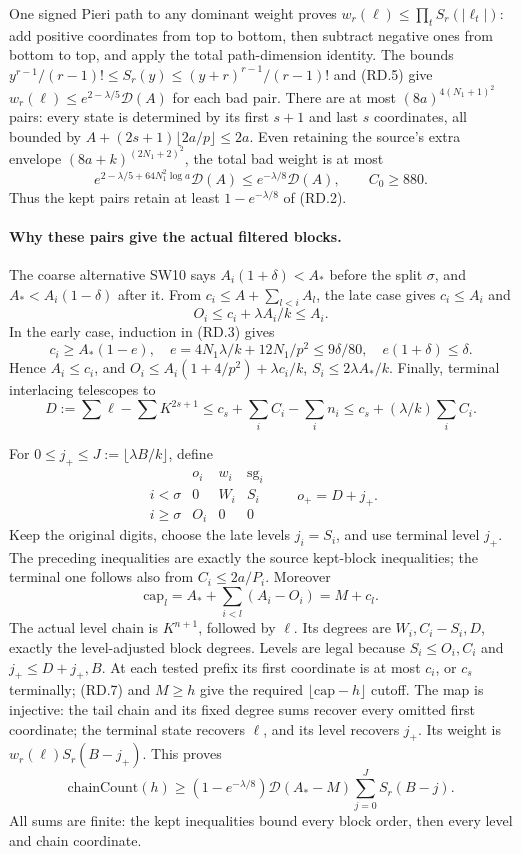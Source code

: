 \documentclass[11pt,a4paper]{article}
\numberwithin{equation}{section}
\theoremstyle{remark}\newtheorem{remark}[theorem]{Remark}
\begin{document}
One signed Pieri path to any dominant weight proves
$w_r(\ell)\le\prod_tS_r(|\ell_t|)$: add positive coordinates from
top to bottom, then subtract negative ones from bottom to top, and
apply the total path-dimension identity. The bounds
$y^{r-1}/(r-1)!\le S_r(y)\le(y+r)^{r-1}/(r-1)!$ and (RD.5)
give $w_r(\ell)\le e^{2-\lambda/5}\mathcal D(A)$ for each bad pair.
There are at most $(8a)^{4(N_1+1)^2}$ pairs: every state is determined
by its first $s+1$ and last $s$ coordinates, all bounded by
$A+(2s+1)\lfloor2a/p\rfloor\le2a$.
Even retaining the source's extra envelope
$(8a+k)^{(2N_1+2)^2}$, the total bad weight is at most
\[
 e^{2-\lambda/5+64N_1^2\log a}\mathcal D(A)
 \le e^{-\lambda/8}\mathcal D(A),\qquad C_0\ge880.
 \tag{RD.6}
\]
Thus the kept pairs retain at least $1-e^{-\lambda/8}$ of (RD.2).

\paragraph{Why these pairs give the actual filtered blocks.}
The coarse alternative SW10 says
$A_i(1+\delta)<A_*$ before the split $\sigma$, and
$A_*<A_i(1-\delta)$ after it. From
$c_i\le A+\sum_{l<i}A_l$, the late case gives $c_i\le A_i$ and
\[
                 O_i\le c_i+\lambda A_i/k\le A_i.
\]
In the early case, induction in (RD.3) gives
\[
 c_i\ge A_*(1-e),\quad
 e=4N_1\lambda/k+12N_1/p^2\le9\delta/80,
 \quad e(1+\delta)\le\delta.
\]
Hence $A_i\le c_i$, and
$O_i\le A_i(1+4/p^2)+\lambda c_i/k$,
$S_i\le2\lambda A_*/k$.
Finally, terminal interlacing telescopes to
\[
 D:=\sum\ell-\sum K^{2s+1}
 \le c_s+\sum_iC_i-\sum_i n_i
 \le c_s+(\lambda/k)\sum_iC_i.
\]

For $0\le j_+\le J:=\lfloor\lambda B/k\rfloor$, define
\[
\begin{array}{c|ccc}
 &o_i&w_i&\mathrm{sg}_i\\ \hline
 i<\sigma&0&W_i&S_i\\
 i\ge\sigma&O_i&0&0
\end{array}
 \qquad o_+=D+j_+.
\]
Keep the original digits, choose the late levels $j_i=S_i$, and use
terminal level $j_+$. The preceding inequalities are exactly the
source kept-block inequalities; the terminal one follows also from
$C_i\le2a/P_i$. Moreover
\[
 \mathrm{cap}_l=A_*+\sum_{i<l}(A_i-O_i)=M+c_l.
 \tag{RD.7}
\]
The actual level chain is $K^{n+1}$, followed by $\ell$.
Its degrees are $W_i,C_i-S_i,D$, exactly the level-adjusted block
degrees. Levels are legal because $S_i\le O_i,C_i$ and $j_+\le D+j_+,B$.
At each tested prefix its first coordinate is at most $c_i$, or $c_s$
terminally; (RD.7) and $M\ge h$ give the required
$\lfloor\mathrm{cap}-h\rfloor$ cutoff.
The map is injective: the tail chain and its fixed degree sums recover
every omitted first coordinate; the terminal state recovers $\ell$,
and its level recovers $j_+$. Its weight is
$w_r(\ell)S_r(B-j_+)$. This proves
\[
 \mathrm{chainCount}(h)\ge
 (1-e^{-\lambda/8})\mathcal D(A_*-M)
                  \sum_{j=0}^{J}S_r(B-j).
 \tag{RD.8}
\]
All sums are finite: the kept inequalities bound every block order,
then every level and chain coordinate.
\end{document}
